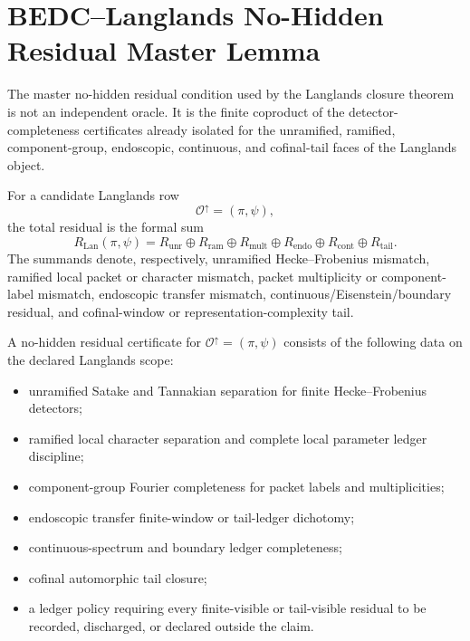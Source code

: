 \section{BEDC--Langlands No-Hidden Residual Master Lemma}
\label{sec:unified-reality-bedc-langlands-no-hidden-residual-master-lemma}

The master no-hidden residual condition used by the Langlands closure
theorem is not an independent oracle. It is the finite coproduct of the
detector-completeness certificates already isolated for the unramified,
ramified, component-group, endoscopic, continuous, and cofinal-tail
faces of the Langlands object.

\begin{definition}
\label{def:unified-reality-total-langlands-residual-decomposition}
For a candidate Langlands row
$$
\mathcal O^\uparrow=(\pi,\psi),
$$
the total residual is the formal sum
$$
R_{\mathrm{Lan}}(\pi,\psi)
=
R_{\mathrm{unr}}
\oplus
R_{\mathrm{ram}}
\oplus
R_{\mathrm{mult}}
\oplus
R_{\mathrm{endo}}
\oplus
R_{\mathrm{cont}}
\oplus
R_{\mathrm{tail}}.
$$
The summands denote, respectively, unramified Hecke--Frobenius
mismatch, ramified local packet or character mismatch, packet
multiplicity or component-label mismatch, endoscopic transfer mismatch,
continuous/Eisenstein/boundary residual, and cofinal-window or
representation-complexity tail.
\end{definition}

\begin{definition}
\label{def:unified-reality-no-hidden-residual-completeness-certificates}
A no-hidden residual certificate for
$\mathcal O^\uparrow=(\pi,\psi)$ consists of the following data on the
declared Langlands scope:
\begin{itemize}
\item unramified Satake and Tannakian separation for finite
Hecke--Frobenius detectors;
\item ramified local character separation and complete local parameter
ledger discipline;
\item component-group Fourier completeness for packet labels and
multiplicities;
\item endoscopic transfer finite-window or tail-ledger dichotomy;
\item continuous-spectrum and boundary ledger completeness;
\item cofinal automorphic tail closure;
\item a ledger policy requiring every finite-visible or tail-visible
residual to be recorded, discharged, or declared outside the claim.
\end{itemize}
\end{definition}


